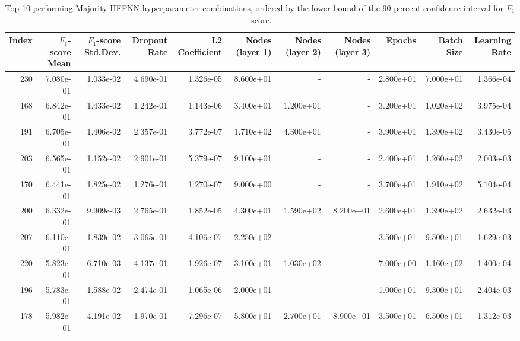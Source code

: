 \begin{table}
\caption{Top 10 performing Majority HFFNN hyperparameter combinations, ordered by the lower bound of the 90 percent confidence interval for $F_1$-score.}
\label{tab:05_best_majority_hffnn_hpars}
\begin{tabular}{rrrrrrrrrrr}
\toprule
Index & $F_1$-score Mean & $F_1$-score Std.Dev. & Dropout Rate & L2 Coefficient & Nodes (layer 1) & Nodes (layer 2) & Nodes (layer 3) & Epochs & Batch Size & Learning Rate \\
\midrule
230 & 7.080e-01 & 1.033e-02 & 4.690e-01 & 1.326e-05 & 8.600e+01 & - & - & 2.800e+01 & 7.000e+01 & 1.366e-04 \\
168 & 6.842e-01 & 1.433e-02 & 1.242e-01 & 1.143e-06 & 3.400e+01 & 1.200e+01 & - & 3.200e+01 & 1.020e+02 & 3.975e-04 \\
191 & 6.705e-01 & 1.406e-02 & 2.357e-01 & 3.772e-07 & 1.710e+02 & 4.300e+01 & - & 3.900e+01 & 1.390e+02 & 3.430e-05 \\
203 & 6.565e-01 & 1.152e-02 & 2.901e-01 & 5.379e-07 & 9.100e+01 & - & - & 2.400e+01 & 1.260e+02 & 2.003e-03 \\
170 & 6.441e-01 & 1.825e-02 & 1.276e-01 & 1.270e-07 & 9.000e+00 & - & - & 3.700e+01 & 1.910e+02 & 5.104e-04 \\
200 & 6.332e-01 & 9.909e-03 & 2.765e-01 & 1.852e-05 & 4.300e+01 & 1.590e+02 & 8.200e+01 & 2.600e+01 & 1.390e+02 & 2.632e-03 \\
207 & 6.110e-01 & 1.839e-02 & 3.065e-01 & 4.106e-07 & 2.250e+02 & - & - & 3.500e+01 & 9.500e+01 & 1.629e-03 \\
220 & 5.823e-01 & 6.710e-03 & 4.137e-01 & 1.926e-07 & 3.100e+01 & 1.030e+02 & - & 7.000e+00 & 1.160e+02 & 1.400e-04 \\
196 & 5.783e-01 & 1.588e-02 & 2.474e-01 & 1.065e-06 & 2.000e+01 & - & - & 1.000e+01 & 9.300e+01 & 2.404e-03 \\
178 & 5.982e-01 & 4.191e-02 & 1.970e-01 & 7.296e-07 & 5.800e+01 & 2.700e+01 & 8.900e+01 & 3.500e+01 & 6.500e+01 & 1.312e-03 \\
\bottomrule
\end{tabular}
\end{table}
